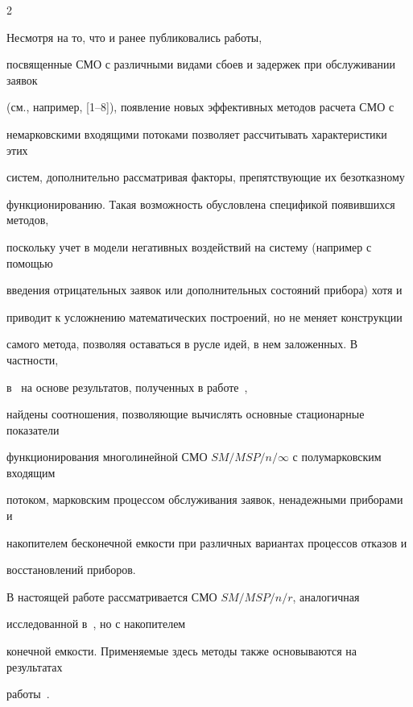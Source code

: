 \begin{multicols}{2}
\thispagestyle{headings}





 Несмотря на то, что и ранее публиковались работы, 


посвященные СМО с различными видами сбоев и задержек при обслуживании заявок 


(см., например, [1--8]), появление новых эффективных методов расчета СМО с 


немарковскими входящими потоками позволяет рассчитывать характеристики этих 


систем, дополнительно рассматривая факторы, препятствующие их безотказному 


функционированию. Такая возможность обусловлена спецификой появившихся методов, 


поскольку учет в модели негативных воздействий на систему (например с помощью 


введения отрицательных заявок или дополнительных состояний прибора) хотя и 


приводит к усложнению математических построений, но не меняет конструкции 


самого метода, позволяя оставаться в русле идей, в нем заложенных. В частности, 


в~\cite{PSCh06} на основе результатов, полученных в работе~\cite{PCh03}, 


найдены соотношения, позволяющие вычислять основные стационарные показатели 


функционирования многолинейной СМО $SM/MSP/n/\infty$ с полумарковским входящим 


потоком, марковским процессом обслуживания заявок, ненадежными приборами и 


накопителем бесконечной емкости при различных вариантах процессов отказов и 


восстановлений приборов.





В настоящей работе рассматривается СМО $SM/MSP/n/r$, аналогичная


исследованной в~\cite{PSCh06}, но с накопителем


конечной емкости. Применяемые здесь методы также основываются на результатах


работы~\cite{PCh03}.












\end{multicols}
